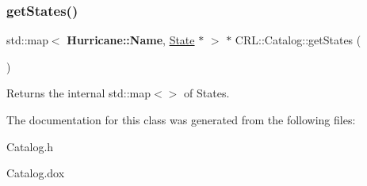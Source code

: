 \subsubsection{\texorpdfstring{get\+States()}{getStates()}}
{\footnotesize\ttfamily std\+::map$<$ \textbf{ Hurricane\+::\+Name}, \mbox{\hyperlink{classCRL_1_1Catalog_1_1State}{State}} $\ast$ $>$ $\ast$ C\+R\+L\+::\+Catalog\+::get\+States (\begin{DoxyParamCaption}{ }\end{DoxyParamCaption})\hspace{0.3cm}{\ttfamily [inline]}}

\begin{DoxyReturn}{Returns}
the internal std\+::map$<$$>$ of States. 
\end{DoxyReturn}


The documentation for this class was generated from the following files\+:\begin{DoxyCompactItemize}
\item 
Catalog.\+h\item 
Catalog.\+dox\end{DoxyCompactItemize}
